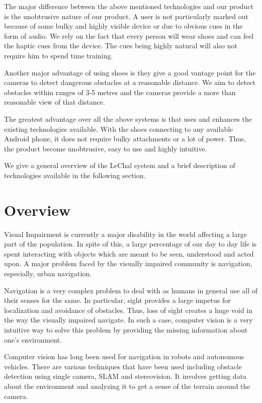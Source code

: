 \documentclass[11pt]{report}
\begin{document}
The major difference between the above mentioned technologies and our product is the unobtrusive nature of our product. A user is not particularly marked out because of some bulky and highly visible device or due to obvious cues in the form of audio. We rely on the fact that every person will wear shoes and can feel the haptic cues from the device. The cues being highly natural will also not require him to spend time training. 

Another major advantage of using shoes is they give a good vantage point for the cameras to detect dangerous obstacles at a reasonable distance. We aim to detect obstacles within ranges of 3-5 metres and the cameras provide a more than reasonable view of that distance. 

The greatest advantage over all the above systems is that uses and enhances the existing technologies available. With the shoes connecting to any available Android phone, it does not require bulky attachments or a lot of power. Thus, the product become unobtrusive, easy to use and highly intuitive.  

We give a general overview of the LeChal system and a brief description of technologies available in the following section.   

\section{Overview}
Visual Impairment is currently a major disability in the world affecting a large part of the population\cite{who}. In spite of this, a large percentage of our day to day life is spent interacting with objects which are meant to be seen, understood and acted upon. A major problem faced by the visually impaired community is navigation, especially, urban navigation. 

Navigation is a very complex problem to deal with as humans in general use all of their senses for the same. In particular, sight provides a large impetus for localization and avoidance of obstacles. Thus, loss of sight creates a huge void in the way the visually impaired navigate. In such a case, computer vision is a very intuitive way to solve this problem by providing the missing information about one's environment.

Computer vision has long been used for navigation in robots and autonomous vehicles\cite{nav1,nav2}. There are various techniques that have been used including obstacle detection using single camera\cite{nav2}, SLAM\cite{slam} and  stereovision\cite{stereo1,outdoorstereo,murray1997stereo,murray2000using}. It involves getting data about the environment and analyzing it to get a sense of the terrain around the camera. 
\end{document}
